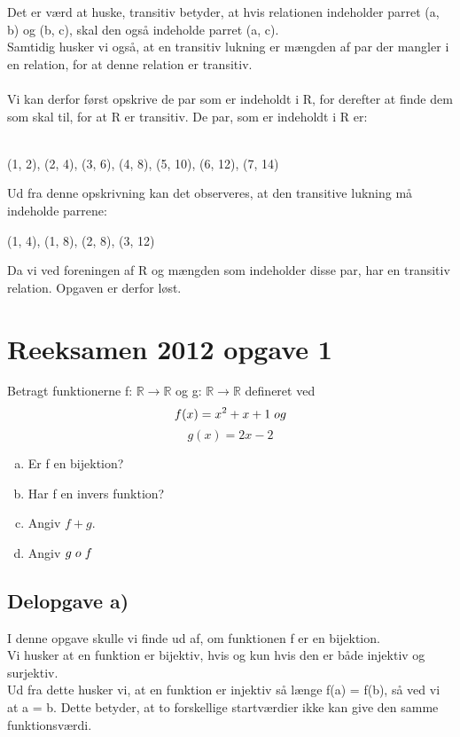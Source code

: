 \documentclass{article}
\begin{document}
Det er værd at huske, transitiv betyder, at hvis relationen indeholder parret (a, b) og (b, c), skal den også indeholde parret (a, c). \\ Samtidig husker vi også, at en transitiv lukning er mængden af par der mangler i en relation, for at denne relation er transitiv. \\ \\

Vi kan derfor først opskrive de par som er indeholdt i R, for derefter at finde dem som skal til, for at R er transitiv. De par, som er indeholdt i R er: \\ \\

\begin{center}
    (1, 2), (2, 4), (3, 6), (4, 8), (5, 10), (6, 12), (7, 14)
\end{center}

Ud fra denne opskrivning kan det observeres, at den transitive lukning må indeholde parrene:

\begin{center}
    (1, 4), (1, 8), (2, 8), (3, 12)
\end{center}

Da vi ved foreningen af R og mængden som indeholder disse par, har en transitiv relation. Opgaven er derfor løst.

\section{Reeksamen 2012 opgave 1}
Betragt funktionerne f:   $\mathbb{R} \rightarrow \mathbb{R}$ og g: $\mathbb{R} \rightarrow \mathbb{R}$ defineret ved
\[f(x)=x^2+x+1 \hspace{1mm}   og\] 
\[g(x)=2x-2\]
\begin{enumerate}[a)]
    \item Er f en bijektion?
    \item Har f en invers funktion?
    \item Angiv $f+g$.
    \item Angiv $g \hspace{1mm} o \hspace{1mm} f$
\end{enumerate}

\subsection{Delopgave a)}

I denne opgave skulle vi finde ud af, om funktionen f er en bijektion. \\
Vi husker at en funktion er bijektiv, hvis og kun hvis den er både injektiv og surjektiv. \\
Ud fra dette husker vi, at en funktion er injektiv så længe f(a) = f(b), så ved vi at a = b. Dette betyder, at to forskellige startværdier ikke kan give den samme funktionsværdi. \\
\end{document}
